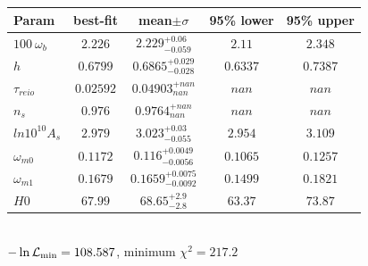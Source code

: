\begin{tabular}{|l|c|c|c|c|} 
 \hline 
Param & best-fit & mean$\pm\sigma$ & 95\% lower & 95\% upper \\ \hline 
$100~\omega{}_{b }$ &$2.226$ & $2.229_{-0.059}^{+0.06}$ & $2.11$ & $2.348$ \\ 
$h$ &$0.6799$ & $0.6865_{-0.028}^{+0.029}$ & $0.6337$ & $0.7387$ \\ 
$\tau{}_{reio }$ &$0.02592$ & $0.04903_{nan}^{+nan}$ & $nan$ & $nan$ \\ 
$n_{s }$ &$0.976$ & $0.9764_{nan}^{+nan}$ & $nan$ & $nan$ \\ 
$ln10^{10}A_{s }$ &$2.979$ & $3.023_{-0.055}^{+0.03}$ & $2.954$ & $3.109$ \\ 
$\omega{}_{m0 }$ &$0.1172$ & $0.116_{-0.0056}^{+0.0049}$ & $0.1065$ & $0.1257$ \\ 
$\omega{}_{m1 }$ &$0.1679$ & $0.1659_{-0.0092}^{+0.0075}$ & $0.1499$ & $0.1821$ \\ 
$H0$ &$67.99$ & $68.65_{-2.8}^{+2.9}$ & $63.37$ & $73.87$ \\ 
\hline 
 \end{tabular} \\ 
$-\ln{\cal L}_\mathrm{min} =108.587$, minimum $\chi^2=217.2$ \\ 
